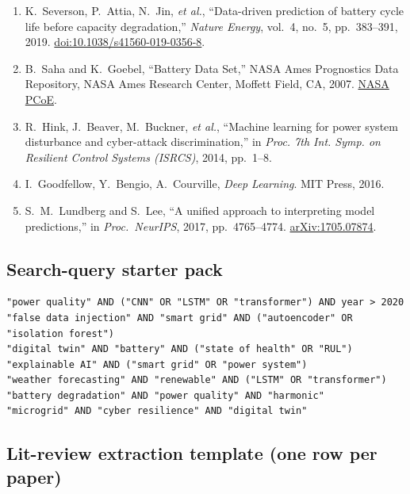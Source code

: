 \documentclass[11pt,a4paper]{article}
\begin{document}
\begin{enumerate}[leftmargin=1.6em]
    \item K.~Severson, P.~Attia, N.~Jin, \textit{et al.}, ``Data-driven
        prediction of battery cycle life before capacity degradation,''
        \textit{Nature Energy}, vol.~4, no.~5, pp.~383--391, 2019.
        \href{https://doi.org/10.1038/s41560-019-0356-8}{doi:10.1038/s41560-019-0356-8}.
    \item B.~Saha and K.~Goebel, ``Battery Data Set,'' NASA Ames
        Prognostics Data Repository, NASA Ames Research Center, Moffett
        Field, CA, 2007.
        \href{https://www.nasa.gov/intelligent-systems-division/discovery-and-systems-health/pcoe/pcoe-data-set-repository/}{NASA PCoE}.
    \item R.~Hink, J.~Beaver, M.~Buckner, \textit{et al.}, ``Machine
        learning for power system disturbance and cyber-attack
        discrimination,'' in \textit{Proc. 7th Int. Symp. on Resilient
        Control Systems (ISRCS)}, 2014, pp.~1--8.
    \item I.~Goodfellow, Y.~Bengio, A.~Courville, \textit{Deep Learning}.
        MIT Press, 2016.
    \item S.~M.~Lundberg and S.~Lee, ``A unified approach to interpreting
        model predictions,'' in \textit{Proc.~NeurIPS}, 2017,
        pp.~4765--4774. \href{https://arxiv.org/abs/1705.07874}{arXiv:1705.07874}.
\end{enumerate}

\subsection{Search-query starter pack}

\begin{lstlisting}
"power quality" AND ("CNN" OR "LSTM" OR "transformer") AND year > 2020
"false data injection" AND "smart grid" AND ("autoencoder" OR "isolation forest")
"digital twin" AND "battery" AND ("state of health" OR "RUL")
"explainable AI" AND ("smart grid" OR "power system")
"weather forecasting" AND "renewable" AND ("LSTM" OR "transformer")
"battery degradation" AND "power quality" AND "harmonic"
"microgrid" AND "cyber resilience" AND "digital twin"
\end{lstlisting}

\subsection{Lit-review extraction template (one row per paper)}
\end{document}
